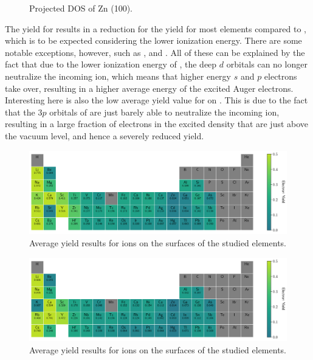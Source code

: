 \begin{refsection}
\begin{figure}[h]
\centering

\caption{Projected DOS of Zn (100).}
\label{quotas:fig-Zn_pdos}
\end{figure}

The yield for  results in a reduction for the yield for most elements compared to , which is to be expected considering the lower ionization energy. There are some notable exceptions, however, such as ,  and . All of these can be explained by the fact that due to the lower ionization energy of , the deep $d$ orbitals can no longer neutralize the incoming ion, which means that higher energy $s$ and $p$ electrons take over, resulting in a higher average energy of the excited Auger electrons. Interesting here is also the low average yield value for  on . This is due to the fact that the $3p$ orbitals of  are just barely able to neutralize the incoming ion, resulting in a large fraction of electrons in the excited density that are just above the vacuum level, and hence a severely reduced yield.

\begin{figure}[h]
\centering
\includegraphics[width=\textwidth]{figures/quotas/He_yield_table.png}
\caption{Average yield results for  ions on the surfaces of the studied elements. }
\label{quotas:fig-He_yield_table}
\end{figure}

\begin{figure}[h]
\centering
\includegraphics[width=\textwidth]{figures/quotas/Ne_yield_table.png}
\caption{Average yield results for  ions on the surfaces of the studied elements. }
\label{quotas:fig-Ne_yield_table}
\end{figure}


\end{refsection}
